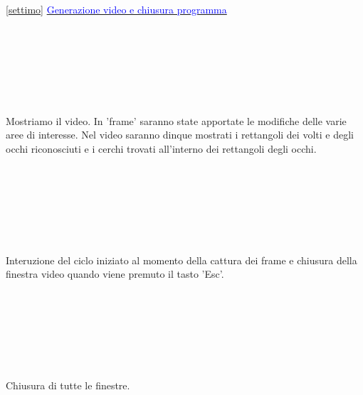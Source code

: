 \documentclass[12pt]{article}
\begin{document}
{\ref {settimo} \underline{\textcolor{blue}{Generazione video e chiusura programma}}
   \\
   \\
   \\
   \\
	\\
	\\
	\\
	\\
   Mostriamo il video. In 'frame' saranno state apportate le modifiche delle varie aree di interesse. Nel video saranno dinque mostrati i rettangoli dei volti e degli occhi riconosciuti e i cerchi trovati all'interno dei rettangoli degli occhi.
   \\
   \\
   \\
   \\
   \\
   \\
   \\
   \\
   Interuzione del ciclo iniziato al momento della cattura dei frame e chiusura della finestra video quando viene premuto il tasto 'Esc'.
   \\
   \\
   \\
   \\
   \\
   \\
   \\
   \\
   Chiusura di tutte le finestre.
   
}
\end{document}
